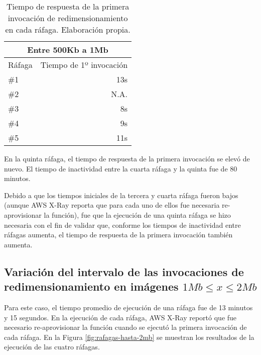 \begin{table}
    \centering
    \begin{tabular}{l|r}
        \toprule[1.5pt]
        \multicolumn{2}{c}{\textbf{Entre 500Kb a 1Mb}} \\
        \midrule
        Ráfaga  & Tiempo de 1º invocación \\
        \midrule
        \#1  & 13s \\
        \#2  & N.A. \\        
        \#3  & 8s \\        
        \#4  & 9s \\        
        \#5  & 11s \\                                
        \bottomrule[1.5pt]
    \end{tabular}
    \caption[Tiempo de respuesta de la primera invocación de redimensionamiento en cada ráfaga.]{Tiempo de respuesta de la primera invocación de redimensionamiento en cada ráfaga. Elaboración propia.}
    \label{table:rafagas-hasta-1mb-tiempos-primera-invocacion}
\end{table}

En la quinta ráfaga, el tiempo de respuesta de la primera invocación se elevó de nuevo. El tiempo de inactividad entre la cuarta ráfaga y la quinta fue de 80 minutos. 

Debido a que los tiempos iniciales de la tercera y cuarta ráfaga fueron bajos (aunque AWS X-Ray reporta que para cada uno de ellos fue necesaria re-aprovisionar la función), fue que la ejecución de una quinta ráfaga se hizo necesaria con el fin de validar que, conforme los tiempos de inactividad entre ráfagas aumenta, el tiempo de respuesta de la primera invocación también aumenta. 

\subsection{Variación del intervalo de las invocaciones de redimensionamiento en imágenes $1Mb \leq x \leq 2Mb$}

Para este caso, el tiempo promedio de ejecución de una ráfaga fue de 13 minutos y 15 segundos. En la ejecución de cada ráfaga, AWS X-Ray reportó que fue necesario re-aprovisionar la función cuando se ejecutó la primera invocación de cada ráfaga. En la Figura \ref{fig:rafagas-hasta-2mb} se muestran los resultados de la ejecución de las cuatro ráfagas.

